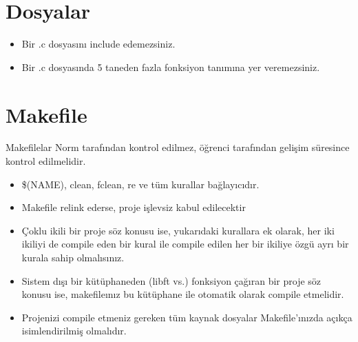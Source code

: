 \documentclass{42-en}
\begin{document}
    \section{Dosyalar}

        \begin{itemize}

            \item Bir .c dosyasını include edemezsiniz.

            \item Bir .c dosyasında 5 taneden fazla fonksiyon tanımına yer veremezsiniz.

        \end{itemize}
        \newpage


    \section{Makefile}

            Makefilelar Norm tarafından kontrol edilmez, öğrenci tarafından gelişim süresince kontrol edilmelidir.

            \begin{itemize}

                \item \$(NAME), clean, fclean, re ve tüm kurallar bağlayıcıdır.

                \item Makefile relink ederse, proje işlevsiz kabul edilecektir

                \item Çoklu ikili bir proje söz konusu ise, yukarıdaki kurallara ek olarak, her iki ikiliyi de compile eden bir kural
ile compile edilen her bir ikiliye özgü ayrı bir kurala sahip olmalısınız.

                \item Sistem dışı bir kütüphaneden (libft vs.) fonksiyon çağıran bir proje söz konusu ise, makefileınız bu kütüphane
ile otomatik olarak compile etmelidir.

                \item Projenizi compile etmeniz gereken tüm kaynak dosyalar Makefile’ınızda açıkça isimlendirilmiş olmalıdır.

            \end{itemize}
\end{document}
